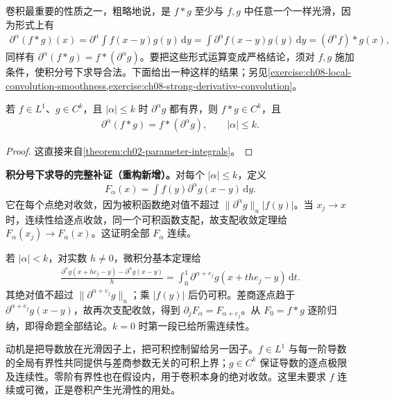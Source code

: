 \documentclass[../../main.tex]{subfiles}
\begin{document}
卷积最重要的性质之一，粗略地说，是 $f*g$ 至少与 $f,g$ 中任意一个一样光滑，因为形式上有
\begin{align*}
\partial^\alpha(f*g)(x)
=\partial^\alpha\int f(x-y)g(y)\,\mathrm dy
=\int\partial^\alpha f(x-y)g(y)\,\mathrm dy
=(\partial^\alpha f)*g(x),
\end{align*}
同样有 $\partial^\alpha(f*g)=f*(\partial^\alpha g)$。要把这些形式运算变成严格结论，须对 $f,g$ 施加条件，使积分号下求导合法。下面给出一种这样的结果；另见\cref{exercise:ch08-local-convolution-smoothness,exercise:ch08-strong-derivative-convolution}。
\begin{proposition}\label{proposition:ch08-convolution-smoothness}
若 $f\in L^1$、$g\in C^k$，且 $|\alpha|\leqslant k$ 时 $\partial^\alpha g$ 都有界，则 $f*g\in C^k$，且
\begin{align*}
\partial^\alpha(f*g)=f*(\partial^\alpha g),\qquad |\alpha|\leqslant k.
\end{align*}
\end{proposition}
\begin{proof}
这直接来自\cref{theorem:ch02-parameter-integrals}。
\end{proof}
\begin{remark}
\textbf{积分号下求导的完整补证（重构新增）。}对每个 $|\alpha|\leqslant k$，定义
\begin{align*}
F_\alpha(x)=\int f(y)\partial^\alpha g(x-y)\,\mathrm dy.
\end{align*}
它在每个点绝对收敛，因为被积函数绝对值不超过 $\|\partial^\alpha g\|_u|f(y)|$。当 $x_j\to x$ 时，连续性给逐点收敛，同一个可积函数支配，故支配收敛定理给 $F_\alpha(x_j)\to F_\alpha(x)$。这证明全部 $F_\alpha$ 连续。

若 $|\alpha|<k$，对实数 $h\ne0$，微积分基本定理给
\begin{align*}
\frac{\partial^\alpha g(x+he_j-y)-\partial^\alpha g(x-y)}h
=\int_0^1\partial^{\alpha+e_j}g(x+the_j-y)\,\mathrm dt.
\end{align*}
其绝对值不超过 $\|\partial^{\alpha+e_j}g\|_u$；乘 $|f(y)|$ 后仍可积。差商逐点趋于 $\partial^{\alpha+e_j}g(x-y)$，故再次支配收敛，得到 $\partial_jF_\alpha=F_{\alpha+e_j}$。从 $F_0=f*g$ 逐阶归纳，即得命题全部结论。$k=0$ 时第一段已给所需连续性。

动机是把导数放在光滑因子上，把可积控制留给另一因子。$f\in L^1$ 与每一阶导数的全局有界性共同提供与差商参数无关的可积上界；$g\in C^k$ 保证导数的逐点极限及连续性。零阶有界性也在假设内，用于卷积本身的绝对收敛。这里未要求 $f$ 连续或可微，正是卷积产生光滑性的用处。
\end{remark}
\end{document}
